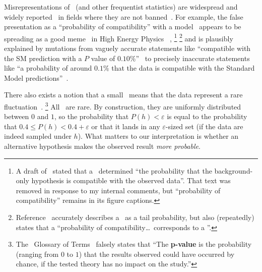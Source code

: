 Misrepresentations of \pvalues\ (and other frequentist statistics) are
widespread and widely reported~\cite{
schervish1996p,
Cohen1994TheEI,
Amrhein2017TheEI,
goodman2008dirty,
greenland2016no,
Bernstein2016princess,
wagenmakers2007practical
}
in fields where they are not banned~\cite{Trafimow2015ban}.
For example, the false presentation as a ``probability of compatibility'' with
a model~\cite{HIGG-2018-04} appears to be spreading as a good
meme~\cite{dawkins1989selfish} in High Energy Physics ~\cite{
roth2007fit,
HIGG-2017-09,
HIGG-2018-27,
HIGG-2018-51,
HIGG-2019-14,
EXOT-2016-36,
EXOT-2018-08,
EXOT-2019-15,
HION-2018-19,
chan2019search,
mastrandrea2019searches,
white2019search,
langford2021combination,
IceCube2013search,
IceCube2014searches,
gerasimov2021new
},%
\footnote{%
A draft of~\cite{HIGG-2018-51} stated that a \pvalue\ determined
``the probability that the background-only hypothesis is compatible with the
observed data''.
That text was removed in response to my internal comments, but
``probability of compatibility'' remains in its figure captions.%
}%
\footnote{%
Reference~\cite{HIGG-2018-57} accurately describes a \pvalue\ as a tail
probability, but also (repeatedly) states that a
``probability of compatibility\ldots\ corresponds to a \pvalue''.%
}%
and is plausibly explained by mutations from vaguely accurate statements like
``compatible with the SM prediction with a $P$ value of $0.10\%$''~\cite{
lhcb2021test
}
to precisely inaccurate statements like
``a probability of around $0.1\%$ that the data is compatible with the
Standard Model predictions''~\cite{cern2021test}.

There also exists a notion that a small \pvalue\ means that the data
represent a rare fluctuation~\cite{murray1997use, atlas2022glossary}.%
\footnote{%
The \atlas\ Glossary of Terms~\cite{atlas2022glossary} falsely states that
``The \textbf{p-value} is the probability (ranging from $0$ to $1$) that the
results observed could have occurred by chance, if the tested theory has no
impact on the study.''%
}
All \pvalues\ are rare.
By construction, they are uniformly distributed between $0$ and $1$, so the
probability that $P(h) < \varepsilon$ is equal to the probability that
$0.4 \leq P(h) < 0.4 + \varepsilon$ or that it lands in any
$\varepsilon$-sized set
(if the data are indeed sampled under $h$).
What matters to our interpretation is whether an alternative hypothesis
makes the observed result \emph{more probable}.

